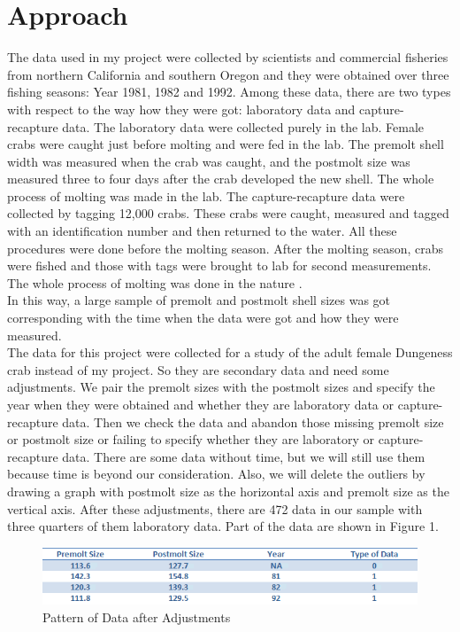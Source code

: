 \documentclass[12pt,letterpaper]{article}
\theoremstyle{definition}
\begin{document}
\section{Approach}
The data used in my project were collected by scientists and commercial fisheries from northern California and southern Oregon and they were obtained over three fishing seasons: Year 1981, 1982 and 1992. Among these data, there are two types with respect to the way how they were got: laboratory data and capture-recapture data. The laboratory data were collected purely in the lab. Female crabs were caught just before molting and were fed in the lab. The premolt shell width was measured when the crab was caught, and the postmolt size was measured three to four days after the crab developed the new shell. The whole process of molting was made in the lab. The capture-recapture data were collected by tagging 12,000 crabs. These crabs were caught, measured and tagged with an identification number and then returned to the water. All these procedures were done before the molting season. After the molting season, crabs were fished and those with tags were brought to lab for second measurements. The whole process of molting was done in the nature \cite{deb}.\\
In this way, a large sample of premolt and postmolt shell sizes was got corresponding with the time when the data were got and how they were measured.\\
The data for this project were collected for a study of the adult female Dungeness crab instead of my project. So they are secondary data and need some adjustments. We pair the premolt sizes with the postmolt sizes and specify the year when they were obtained and whether they are laboratory data or capture-recapture data. Then we check the data and abandon those missing premolt size or postmolt size or failing to specify whether they are laboratory or capture-recapture data. There are some data without time, but we will still use them because time is beyond our consideration. Also, we will delete the outliers by drawing a graph with postmolt size as the horizontal axis and premolt size as the vertical axis. After these adjustments, there are 472 data in our sample with three quarters of them laboratory data. Part of the data are shown in Figure 1.\\

\begin{figure}[!htb]
    \begin{center}
        \includegraphics[width=\textwidth]{data.png}
    \end{center}
    \caption{Pattern of Data after Adjustments}
\end{figure}
\end{document}
